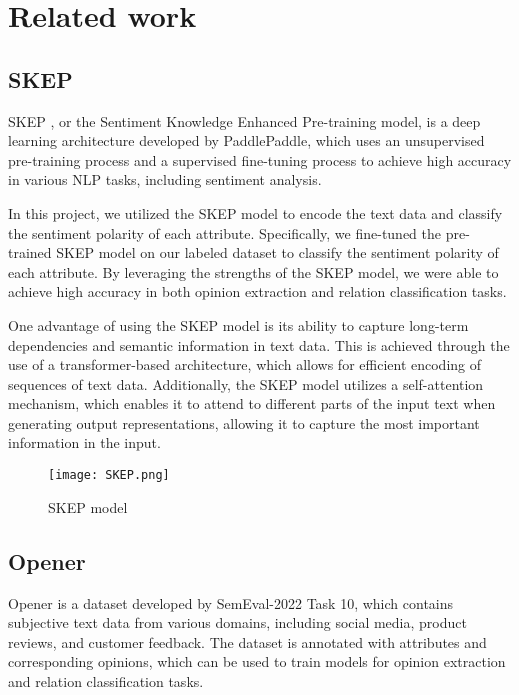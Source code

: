 \section{Related work}
\subsection{SKEP}

SKEP \cite{DBLP:journals/corr/abs-2005-05635}, or the Sentiment Knowledge Enhanced Pre-training model, is a deep learning architecture developed by PaddlePaddle, which uses an unsupervised pre-training process and a supervised fine-tuning process to achieve high accuracy in various NLP tasks, including sentiment analysis.

In this project, we utilized the SKEP model to encode the text data and classify the sentiment polarity of each attribute. Specifically, we fine-tuned the pre-trained SKEP model on our labeled dataset to classify the sentiment polarity of each attribute. By leveraging the strengths of the SKEP model, we were able to achieve high accuracy in both opinion extraction and relation classification tasks.

One advantage of using the SKEP model is its ability to capture long-term dependencies and semantic information in text data. This is achieved through the use of a transformer-based architecture, which allows for efficient encoding of sequences of text data. Additionally, the SKEP model utilizes a self-attention mechanism, which enables it to attend to different parts of the input text when generating output representations, allowing it to capture the most important information in the input.

\begin{figure}
    \centering
    \texttt{[image: SKEP.png]}
    \caption{SKEP model}
    \label{fig:SKEP}
\end{figure}

\subsection{Opener}

Opener is a dataset developed by SemEval-2022 Task 10, which contains subjective text data from various domains, including social media, product reviews, and customer feedback. The dataset is annotated with attributes and corresponding opinions, which can be used to train models for opinion extraction and relation classification tasks.

